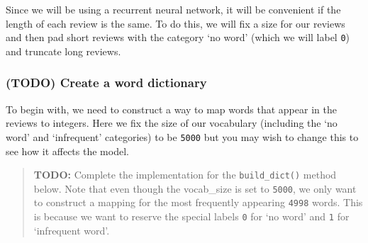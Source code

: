 \documentclass[11pt]{article}
\begin{document}
Since we will be using a recurrent neural network, it will be convenient
if the length of each review is the same. To do this, we will fix a size
for our reviews and then pad short reviews with the category `no word'
(which we will label \texttt{0}) and truncate long reviews.

    \hypertarget{todo-create-a-word-dictionary}{%
\subsubsection{(TODO) Create a word
dictionary}\label{todo-create-a-word-dictionary}}

To begin with, we need to construct a way to map words that appear in
the reviews to integers. Here we fix the size of our vocabulary
(including the `no word' and `infrequent' categories) to be
\texttt{5000} but you may wish to change this to see how it affects the
model.

\begin{quote}
\textbf{TODO:} Complete the implementation for the
\texttt{build\_dict()} method below. Note that even though the
vocab\_size is set to \texttt{5000}, we only want to construct a mapping
for the most frequently appearing \texttt{4998} words. This is because
we want to reserve the special labels \texttt{0} for `no word' and
\texttt{1} for `infrequent word'.
\end{quote}
\end{document}
